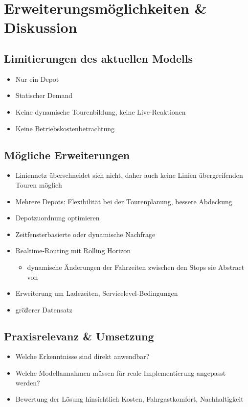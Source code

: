 \chapter{Erweiterungsmöglichkeiten \& Diskussion}
\section{Limitierungen des aktuellen Modells}
\begin{itemize}
    \item Nur ein Depot
    \item Statischer Demand
    \item Keine dynamische Tourenbildung, keine Live-Reaktionen
    \item Keine Betriebskostenbetrachtung
\end{itemize}

\section{Mögliche Erweiterungen}
\begin{itemize}
    \item Liniennetz überschneidet sich nicht, daher auch keine Linien übergreifenden Touren möglich
    \item Mehrere Depots: Flexibilität bei der Tourenplanung, bessere Abdeckung
    \item Depotzuordnung optimieren
    \item Zeitfensterbasierte oder dynamische Nachfrage
    \item Realtime-Routing mit Rolling Horizon
    \begin{itemize}
        \item dynamische Änderungen der Fahrzeiten zwischen den Stops sie Abstract von \textcite{lian_-demand_2023} 
    \end{itemize}
    \item Erweiterung um Ladezeiten, Servicelevel-Bedingungen
    \item größerer Datensatz
\end{itemize}

\section{Praxisrelevanz \& Umsetzung}
\begin{itemize}
    \item Welche Erkenntnisse sind direkt anwendbar?
    \item Welche Modellannahmen müssen für reale Implementierung angepasst werden?
    \item Bewertung der Lösung hinsichtlich Kosten, Fahrgastkomfort, Nachhaltigkeit
\end{itemize}
